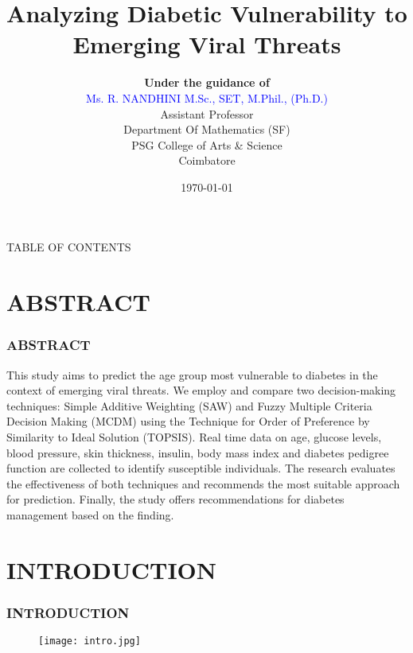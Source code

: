 \documentclass[serif, aspectratio=169]{beamer}
\title {Analyzing Diabetic Vulnerability to Emerging Viral Threats}
\author[]{\textbf{Under the guidance of}\\
\textcolor{blue}{Ms. R. NANDHINI M.Sc., SET, M.Phil., (Ph.D.)}\\
Assistant Professor\\
Department Of Mathematics (SF)\\
PSG College of Arts \& Science\\
Coimbatore}
\institute{\textbf{Presented by}\\
\textbf{\textcolor{red}{SIBIVENDHAN K - 23MMA132\\
SINEKA S - 23MMA133}}}
\date{\small \today}
\newtheorem{thm co}{Theorem contd...}
\begin{document}
\begin{frame}
    \titlepage
    \vspace*{-0.6cm}

\end{frame}

\begin{frame}
\begin{block}{TABLE OF CONTENTS}
    

\tableofcontents[sectionstyle=show,
subsectionstyle=show/shaded/hide,
subsubsectionstyle=show/shaded/hide]
\end{block}
\end{frame}


\section{ABSTRACT}
\begin{frame}
\frametitle<presentation>{ABSTRACT}
\hspace{1em}This study aims to predict the age group most vulnerable to diabetes in the context of emerging viral threats. We employ and compare two decision-making techniques: Simple Additive Weighting (SAW) and Fuzzy Multiple Criteria Decision Making (MCDM) using the Technique for Order of Preference by Similarity to Ideal Solution (TOPSIS). Real time data on age, glucose levels, blood pressure, skin thickness, insulin, body mass index and diabetes pedigree function are collected to identify susceptible individuals. The research evaluates the effectiveness of both techniques and recommends the most suitable approach for prediction. Finally, the study offers recommendations for diabetes management based on the finding.   
\end{frame}

\section{INTRODUCTION}
\begin{frame}
\frametitle<presentation>{INTRODUCTION}
\begin{figure}
    \centering
    \texttt{[image: intro.jpg]}
\end{figure}
\end{frame}
\end{document}
